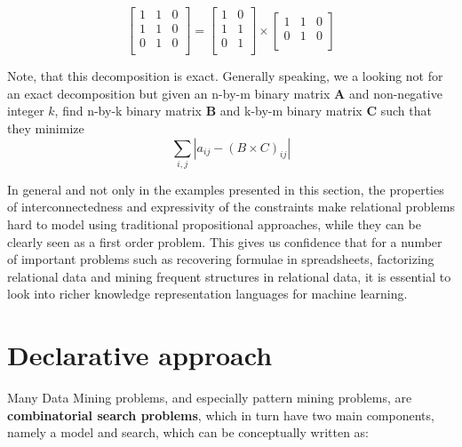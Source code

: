 \def\Amtrx{\begin{bmatrix}
    1   & 1 & 0 \\
    1   & 1 & 0 \\
    0   & 1 & 0 \\
\end{bmatrix}}

\def\Bmtrx{\begin{bmatrix}
1   &0  \\
1   &1  \\
0   &1  \\
\end{bmatrix}}

\def\Cmtrx{\begin{bmatrix}
1   &1  & 0 \\
0   &1  & 0 \\
\end{bmatrix}}

\begin{equation*}
    \Amtrx =  \Bmtrx \times \Cmtrx
\end{equation*}

Note, that this decomposition is exact. Generally speaking, we a
looking not for an exact decomposition but given an n-by-m binary
matrix $\mathbf{A}$ and non-negative integer $k$, find n-by-k binary
matrix $\mathbf{B}$ and k-by-m binary matrix $\mathbf{C}$ such that they minimize
\begin{equation*}
    \sum_{i,j} | a_{ij} - (B\times C)_{ij}|
\end{equation*}


In general and not only in the examples presented in this section, the
properties of interconnectedness and expressivity of the constraints
make relational problems hard to model using traditional propositional
approaches, while they can be clearly seen as a first order problem. This gives us confidence that for a number of important problems such as recovering formulae in spreadsheets, factorizing relational data and mining frequent structures in relational data, it is essential to look into richer knowledge representation languages for machine learning.

\section{Declarative approach}
Many Data Mining problems, and especially pattern mining
problems, are \textbf{combinatorial search problems}, which in turn
have two main components, namely a model and search, which can be
conceptually written as:

